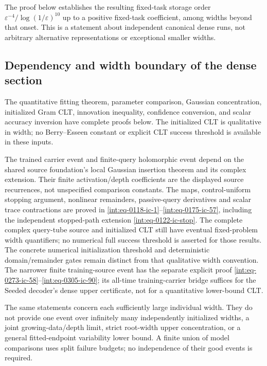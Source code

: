 
The proof below establishes the resulting fixed-task storage order \(\varepsilon^{-4}/\log(1/\varepsilon)^{10}\) up to a positive fixed-task coefficient, among widths beyond that onset. This is a statement about independent canonical dense runs, not arbitrary alternative representations or exceptional smaller widths.


\subsection{Dependency and width boundary of the dense section}
\label{int:dense-dependency-boundary}


The quantitative fitting theorem, parameter comparison, Gaussian concentration, initialized Gram CLT, innovation inequality, confidence conversion, and scalar accuracy inversion have complete proofs below. The initialized CLT is qualitative in width; no Berry--Esseen constant or explicit CLT success threshold is available in these inputs.



The trained carrier event and finite-query holomorphic event depend on the shared source foundation's local Gaussian insertion theorem and its complex extension. Their finite activation/depth coefficients are the displayed source recurrences, not unspecified comparison constants. The maps, control-uniform stopping argument, nonlinear remainders, passive-query derivatives and scalar trace contractions are proved in \eqref{int:eq-0118-ic-1}--\allowbreak \eqref{int:eq-0175-ic-57}, including the independent stopped-path extension \eqref{int:eq-0122-ic-stop}. The complete complex query-tube source and initialized CLT still have eventual fixed-problem width quantifiers; no numerical full success threshold is asserted for those results. The concrete numerical initialization threshold and deterministic domain/remainder gates remain distinct from that qualitative width convention. The narrower finite training-source event has the separate explicit proof \eqref{int:eq-0273-ic-58}--\allowbreak \eqref{int:eq-0305-ic-90}; its all-time training-carrier bridge suffices for the Seeded decoder's dense upper certificate, not for a quantitative lower-bound CLT.



The same statements concern each sufficiently large individual width. They do not provide one event over infinitely many independently initialized widths, a joint growing-data/depth limit, strict root-width upper concentration, or a general fitted-endpoint variability lower bound. A finite union of model comparisons uses split failure budgets; no independence of their good events is required.


